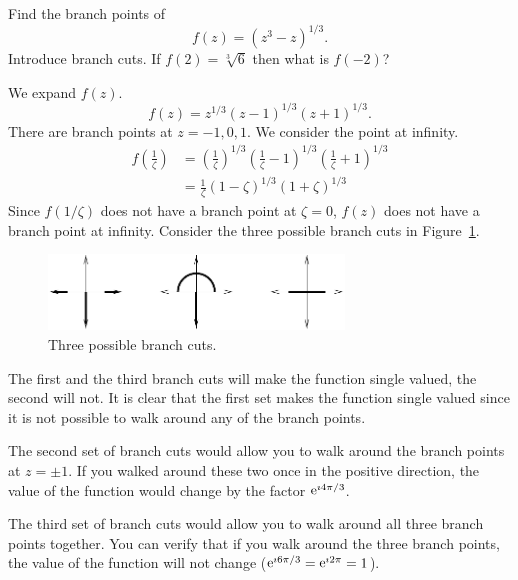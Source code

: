 \begin{Example}
  Find the branch points of
  \[ 
  f(z) = \left( z^3 - z \right)^{1/3}. 
  \]
  Introduce branch cuts.  If $f(2) = \sqrt[3]{6}$ then what is $f(-2)$?

  We expand $f(z)$.
  \[ 
  f(z) = z^{1/3} (z-1)^{1/3} (z+1)^{1/3}. 
  \]
  There are branch points at $z = -1, 0, 1$.
  We consider the point at infinity.
  \begin{align*}
    f \left( \frac{1}{\zeta} \right)
    &= \left( \frac{1}{\zeta} \right)^{1/3}  \left( \frac{1}{\zeta}  - 1 \right)^{1/3} 
    \left( \frac{1}{\zeta} + 1 \right)^{1/3} 
    \\
    &= \frac{1}{\zeta}  \left( 1 - \zeta \right)^{1/3}  \left( 1 + \zeta \right)^{1/3}
  \end{align*}
  Since $f(1 / \zeta)$ does not have a branch point at $\zeta = 0$, $f(z)$ does 
  not have a branch point at infinity.
  Consider the three possible branch cuts in Figure~\ref{threebc}.

  \begin{figure}[htb!]
    \begin{center}
      \includegraphics[width=0.7\textwidth]{fcv/function/threebc}
    \end{center}
    \caption{Three possible branch cuts.}
    \label{threebc}
  \end{figure}

  The first and the third branch cuts will make the function single valued,
  the second will not.
  It is clear that the first set makes the function single valued since it
  is not possible to walk around any of the branch points.

  The second set of branch cuts would allow you to walk around the branch
  points at $z = \pm 1$.  If you walked around these two once in the positive
  direction, the value of the function would change by the factor
  $\mathop{\mathrm{e}}\nolimits^{\imath 4 \pi / 3}$.

  The third set of branch cuts would allow you to walk around all three
  branch points together.  You can verify that if you walk around the
  three branch points, the value of the function will not change
  ($\mathop{\mathrm{e}}\nolimits^{\imath 6 \pi / 3} = \mathop{\mathrm{e}}\nolimits^{\imath 2 \pi} = 1$).


\end{Example}
